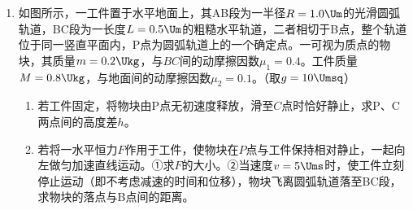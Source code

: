 \documentclass[\gkver]{gaokaozhenti}
\begin{document}
\begin{enumerate}
{\begin{enumerate}
	\item
	电流表应选 $A_{1}$，电源应选 $E_{1}$；电路采用电流表外接、滑动变阻器限流接法。

\end{enumerate}
}

\item
如图所示，一工件置于水平地面上，其AB段为一半径$R=1.0\Um$的光滑圆弧轨道，BC段为一长度$L=0.5\Um$的粗糙水平轨道，二者相切于B点，整个轨道位于同一竖直平面内，P点为圆弧轨道上的一个确定点。一可视为质点的物块，其质量$m=0.2\Ukg$，与$BC$间的动摩擦因数$\mu_{1}=0.4$。工件质量$M=0.8\Ukg$，与地面间的动摩擦因数$\mu_{2}=0.1$。（取$g=10\Umsq$）
\begin{enumerate}
	\item
	若工件固定，将物块由P点无初速度释放，滑至$C$点时恰好静止，求P、C两点间的高度差$h$。
	\item
	若将一水平恒力$F$作用于工件，使物块在$P$点与工件保持相对静止，一起向左做匀加速直线运动。①求$F$的大小。②当速度$v=5\Ums$时，使工件立刻停止运动（即不考虑减速的时间和位移），物块飞离圆弧轨道落至BC段，求物块的落点与B点间的距离。
\end{enumerate}
\end{enumerate}
\end{document}

